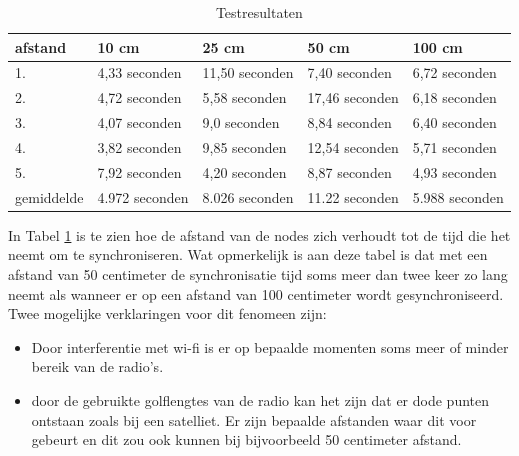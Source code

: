 \documentclass{article}
\begin{document}
    
\begin{table}[h]
	\centering\caption{Testresultaten}
	\label{tab: testresultaten}
    \begin{tabular}{| l | l | l | l |  l |}\hline
    \textbf{afstand } & \textbf{10 cm } & \textbf{25 cm} & \textbf{50 cm} & \textbf{100 cm} \\ \hline\hline
   1. & 4,33 seconden & 11,50 seconden& 7,40 seconden& 6,72 seconden\\ \hline
    2. & 4,72 seconden & 5,58 seconden& 17,46 seconden& 6,18 seconden\\ \hline
    3. & 4,07 seconden & 9,0 seconden& 8,84 seconden& 6,40 seconden\\ \hline
    4. & 3,82 seconden & 9,85 seconden& 12,54 seconden& 5,71 seconden\\ \hline
    5. & 7,92 seconden & 4,20 seconden& 8,87 seconden& 4,93 seconden\\ \hline \hline
   gemiddelde & 4.972 seconden & 8.026 seconden& 11.22 seconden& 5.988 seconden\\\hline
    \end{tabular}
\end{table}
In Tabel \ref{tab: testresultaten} is te zien hoe de afstand van de nodes zich verhoudt tot de tijd die het neemt om te synchroniseren. Wat opmerkelijk is aan deze tabel is dat met een afstand van 50 centimeter de synchronisatie tijd soms meer dan twee keer zo lang neemt als wanneer er op een afstand van 100 centimeter wordt gesynchroniseerd. Twee mogelijke verklaringen voor dit fenomeen zijn:
\begin{itemize}
	\item Door interferentie met wi-fi is er op bepaalde momenten soms meer of minder bereik van de radio's.
	\item door de gebruikte golflengtes van de radio kan het zijn dat er dode punten ontstaan zoals bij een satelliet. Er zijn bepaalde afstanden waar dit voor gebeurt en dit zou ook kunnen bij bijvoorbeeld 50 centimeter afstand. 
\end{itemize}
\end{document}
